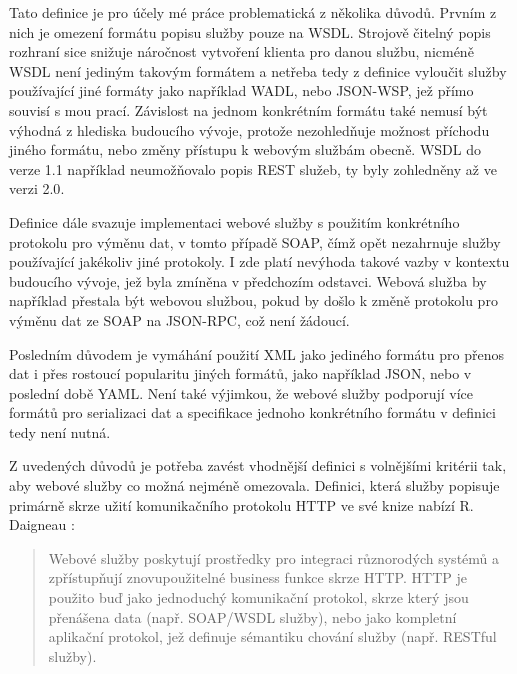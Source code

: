 \documentclass[czech,DP]{thesiskiv}
\begin{document}

Tato definice je pro účely mé práce problematická z několika důvodů. Prvním z nich je omezení formátu popisu služby pouze na WSDL. Strojově čitelný popis rozhraní sice snižuje náročnost vytvoření klienta pro danou službu, nicméně WSDL není jediným takovým formátem a netřeba tedy z definice vyloučit služby používající jiné formáty jako například WADL, nebo JSON-WSP, jež přímo souvisí s mou prací. Závislost na jednom konkrétním formátu také nemusí být výhodná z hlediska budoucího vývoje, protože nezohledňuje možnost příchodu jiného formátu, nebo změny přístupu k webovým službám obecně. WSDL do verze 1.1 například neumožňovalo popis REST služeb, ty byly zohledněny až ve verzi 2.0\cite{restWsdl}.  

Definice dále svazuje implementaci webové služby s použitím konkrétního protokolu pro výměnu dat, v tomto případě SOAP, čímž opět nezahrnuje služby používající jakékoliv jiné protokoly. I zde platí nevýhoda takové vazby v kontextu budoucího vývoje, jež byla zmíněna v předchozím odstavci. Webová služba by například přestala být webovou službou, pokud by došlo k změně protokolu pro výměnu dat ze SOAP na JSON-RPC, což není žádoucí.

Posledním důvodem je vymáhání použití XML jako jediného formátu pro přenos dat i přes rostoucí popularitu jiných formátů, jako například JSON, nebo v poslední době YAML. Není také výjimkou, že webové služby podporují více formátů pro serializaci dat a specifikace jednoho konkrétního formátu v definici tedy není nutná. 

Z uvedených důvodů je potřeba zavést vhodnější definici s volnějšími kritérii tak, aby webové služby co možná nejméně omezovala. Definici, která služby popisuje primárně skrze užití komunikačního protokolu HTTP ve své knize nabízí R. Daigneau \cite{fromObjectsToWs}: 

\begin{quote}
	Webové služby poskytují prostředky pro integraci různorodých systémů a zpřístupňují znovupoužitelné business funkce skrze HTTP. HTTP je použito buď jako jednoduchý komunikační protokol, skrze který jsou přenášena data (např. SOAP/WSDL služby), nebo jako kompletní aplikační protokol, jež definuje sémantiku chování služby (např. RESTful služby).
\end{quote}
\end{document}
